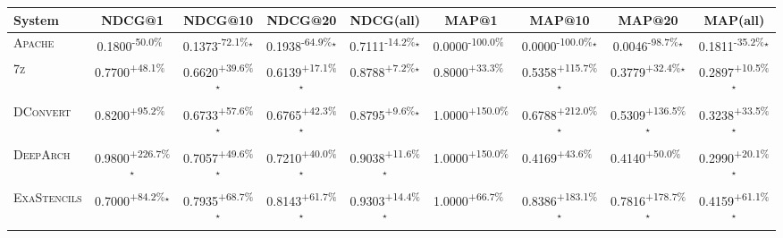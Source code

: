 \begin{table}[htbp]
\centering
\renewcommand{\arraystretch}{1.2}
\begin{tabular}{l|cccc|cccc}
\hline
System & NDCG@1 & NDCG@10 & NDCG@20 & NDCG(all) & MAP@1 & MAP@10 & MAP@20 & MAP(all) \\ \hline
\textsc{Apache} & \cellcolor{red!30}0.1800\textsuperscript{-50.0\%}$^{\,\,\,}$ & \cellcolor{red!30}0.1373\textsuperscript{-72.1\%}$^\star$ & \cellcolor{red!30}0.1938\textsuperscript{-64.9\%}$^\star$ & \cellcolor{red!30}0.7111\textsuperscript{-14.2\%}$^\star$ & \cellcolor{red!30}0.0000\textsuperscript{-100.0\%}$^{\,\,\,}$ & \cellcolor{red!30}0.0000\textsuperscript{-100.0\%}$^\star$ & \cellcolor{red!30}0.0046\textsuperscript{-98.7\%}$^\star$ & \cellcolor{red!30}0.1811\textsuperscript{-35.2\%}$^\star$ \\
\textsc{7z} & \cellcolor{green!30}0.7700\textsuperscript{+48.1\%}$^{\,\,\,}$ & \cellcolor{green!30}0.6620\textsuperscript{+39.6\%}$^\star$ & \cellcolor{green!30}0.6139\textsuperscript{+17.1\%}$^\star$ & \cellcolor{green!30}0.8788\textsuperscript{+7.2\%}$^\star$ & \cellcolor{green!30}0.8000\textsuperscript{+33.3\%}$^{\,\,\,}$ & \cellcolor{green!30}0.5358\textsuperscript{+115.7\%}$^\star$ & \cellcolor{green!30}0.3779\textsuperscript{+32.4\%}$^\star$ & \cellcolor{green!30}0.2897\textsuperscript{+10.5\%}$^\star$ \\
\textsc{DConvert} & \cellcolor{green!30}0.8200\textsuperscript{+95.2\%}$^{\,\,\,}$ & \cellcolor{green!30}0.6733\textsuperscript{+57.6\%}$^\star$ & \cellcolor{green!30}0.6765\textsuperscript{+42.3\%}$^\star$ & \cellcolor{green!30}0.8795\textsuperscript{+9.6\%}$^\star$ & \cellcolor{green!30}1.0000\textsuperscript{+150.0\%}$^{\,\,\,}$ & \cellcolor{green!30}0.6788\textsuperscript{+212.0\%}$^\star$ & \cellcolor{green!30}0.5309\textsuperscript{+136.5\%}$^\star$ & \cellcolor{green!30}0.3238\textsuperscript{+33.5\%}$^\star$ \\
\textsc{DeepArch} & \cellcolor{green!30}0.9800\textsuperscript{+226.7\%}$^\star$ & \cellcolor{green!30}0.7057\textsuperscript{+49.6\%}$^\star$ & \cellcolor{green!30}0.7210\textsuperscript{+40.0\%}$^\star$ & \cellcolor{green!30}0.9038\textsuperscript{+11.6\%}$^\star$ & \cellcolor{green!30}1.0000\textsuperscript{+150.0\%}$^{\,\,\,}$ & \cellcolor{green!30}0.4169\textsuperscript{+43.6\%}$^{\,\,\,}$ & \cellcolor{green!30}0.4140\textsuperscript{+50.0\%}$^{\,\,\,}$ & \cellcolor{green!30}0.2990\textsuperscript{+20.1\%}$^\star$ \\
\textsc{ExaStencils} & \cellcolor{green!30}0.7000\textsuperscript{+84.2\%}$^\star$ & \cellcolor{green!30}0.7935\textsuperscript{+68.7\%}$^\star$ & \cellcolor{green!30}0.8143\textsuperscript{+61.7\%}$^\star$ & \cellcolor{green!30}0.9303\textsuperscript{+14.4\%}$^\star$ & \cellcolor{green!30}1.0000\textsuperscript{+66.7\%}$^{\,\,\,}$ & \cellcolor{green!30}0.8386\textsuperscript{+183.1\%}$^\star$ & \cellcolor{green!30}0.7816\textsuperscript{+178.7\%}$^\star$ & \cellcolor{green!30}0.4159\textsuperscript{+61.1\%}$^\star$ \\

\end{tabular}
\end{table}
